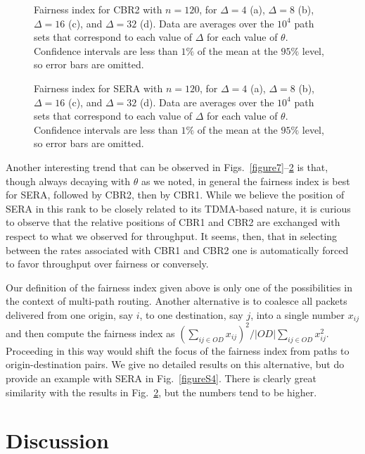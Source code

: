 \documentclass{article}
\begin{document}
\begin{figure}[p]
\centering
{}
\caption{Fairness index for CBR2 with $n=120$, for $\Delta=4$ (a), $\Delta=8$
(b), $\Delta=16$ (c), and $\Delta=32$ (d). Data are averages over the $10^4$
path sets that correspond to each value of $\Delta$ for each value of $\theta$.
Confidence intervals are less than $1\%$ of the mean at the $95\%$ level, so
error bars are omitted.}
\label{figure8}
\end{figure}

\begin{figure}[p]
\centering
{}
\caption{Fairness index for SERA with $n=120$, for $\Delta=4$ (a), $\Delta=8$
(b), $\Delta=16$ (c), and $\Delta=32$ (d). Data are averages over the $10^4$
path sets that correspond to each value of $\Delta$ for each value of $\theta$.
Confidence intervals are less than $1\%$ of the mean at the $95\%$ level, so
error bars are omitted.}
\label{figure9}
\end{figure}

Another interesting trend that can be observed in
Figs.~\ref{figure7}--\ref{figure9} is that, though always decaying with $\theta$
as we noted, in general the fairness index is best for SERA, followed by CBR2,
then by CBR1. While we believe the position of SERA in this rank to be closely
related to its TDMA-based nature, it is curious to observe that the relative
positions of CBR1 and CBR2 are exchanged with respect to what we observed for
throughput. It seems, then, that in selecting between the rates associated with
CBR1 and CBR2 one is automatically forced to favor throughput over fairness or
conversely.

Our definition of the fairness index given above is only one of the
possibilities in the context of multi-path routing. Another alternative is to
coalesce all packets delivered from one origin, say $i$, to one destination, say
$j$, into a single number $x_{ij}$ and then compute the fairness index as
$(\sum_{ij\in OD}x_{ij})^2/\vert OD\vert\sum_{ij\in OD}x_{ij}^2$. Proceeding in
this way would shift the focus of the fairness index from paths to
origin-destination pairs. We give no detailed results on this alternative, but
do provide an example with SERA in Fig.~\ref{figureS4}. There is clearly great
similarity with the results in Fig.~\ref{figure9}, but the numbers tend to be
higher.

\section{Discussion}\label{sec:discussion}
\end{document}

